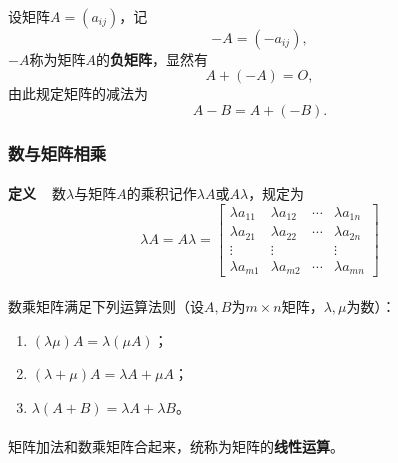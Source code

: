 \paragraph{}
设矩阵$A=(a_{ij})$，记
\begin{equation*}
  -A = (-a_{ij}),
\end{equation*}
$-A$称为矩阵$A$的\textbf{负矩阵}，显然有
\begin{equation*}
  A + (-A) = O,
\end{equation*}
由此规定矩阵的减法为
\begin{equation*}
  A-B=A+(-B).
\end{equation*}

\subsubsection{数与矩阵相乘}
\paragraph{}
\textbf{定义~~}数$\lambda$与矩阵$A$的乘积记作$\lambda A$或$A\lambda$，规定为
\begin{equation*}
\lambda A = A\lambda = \left[\begin{array}{cccc}
  \lambda a_{11} & \lambda a_{12} & \cdots & \lambda a_{1n} \\
  \lambda a_{21} & \lambda a_{22} & \cdots & \lambda a_{2n} \\
  \vdots & \vdots &  & \vdots \\
  \lambda a_{m1} & \lambda a_{m2} & \cdots & \lambda a_{mn}
\end{array}\right]
\end{equation*}

\paragraph{}
数乘矩阵满足下列运算法则（设$A,B$为$m\times n$矩阵，$\lambda, \mu$为数）：
\begin{enumerate}
  \item $(\lambda\mu)A=\lambda(\mu A)$；
  \item $(\lambda + \mu)A = \lambda A + \mu A$；
  \item $\lambda(A+B)=\lambda A + \lambda B$。
\end{enumerate}

\paragraph{}
矩阵加法和数乘矩阵合起来，统称为矩阵的\textbf{线性运算}。

